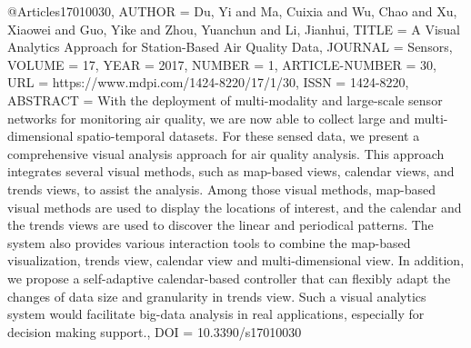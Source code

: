 
@Article{s17010030,
AUTHOR = {Du, Yi and Ma, Cuixia and Wu, Chao and Xu, Xiaowei and Guo, Yike and Zhou, Yuanchun and Li, Jianhui},
TITLE = {A Visual Analytics Approach for Station-Based Air Quality Data},
JOURNAL = {Sensors},
VOLUME = {17},
YEAR = {2017},
NUMBER = {1},
ARTICLE-NUMBER = {30},
URL = {https://www.mdpi.com/1424-8220/17/1/30},
ISSN = {1424-8220},
ABSTRACT = {With the deployment of multi-modality and large-scale sensor networks for monitoring air quality, we are now able to collect large and multi-dimensional spatio-temporal datasets. For these sensed data, we present a comprehensive visual analysis approach for air quality analysis. This approach integrates several visual methods, such as map-based views, calendar views, and trends views, to assist the analysis. Among those visual methods, map-based visual methods are used to display the locations of interest, and the calendar and the trends views are used to discover the linear and periodical patterns. The system also provides various interaction tools to combine the map-based visualization, trends view, calendar view and multi-dimensional view. In addition, we propose a self-adaptive calendar-based controller that can flexibly adapt the changes of data size and granularity in trends view. Such a visual analytics system would facilitate big-data analysis in real applications, especially for decision making support.},
DOI = {10.3390/s17010030}
}



